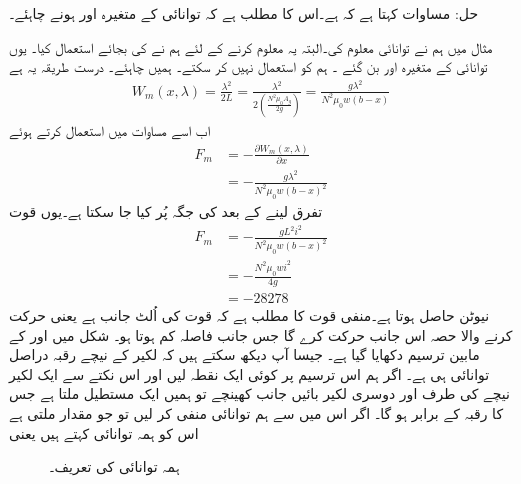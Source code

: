 حل:
	 مساوات   کہتا ہے کہ  ہے۔اس کا مطلب ہے کہ توانائی کے متغیرہ  اور  ہونے چاہئے۔

مثال  میں ہم نے توانائی معلوم کی۔البتہ یہ معلوم کرنے  کے لئے ہم نے  کی  بجائے  استعمال کیا۔ یوں  توانائی کے متغیرہ   اور  بن گئے ۔  ہم  کو استعمال نہیں کر سکتے۔ ہمیں  چاہئے۔ درست طریقہ یہ ہے
\begin{align*}
W_m(x,\lambda)=\frac{\lambda^2}{2 L}=\frac{\lambda^2}{2 \left(\frac{N^2 \mu_0 A_g}{2 g} \right)}=\frac{ g \lambda^2}{N^2 \mu_0 w (b-x)}
\end{align*}
اب اسے مساوات  میں استعمال کرتے ہوئے
\begin{align*}
F_m&=-\frac{\partial W_m(x,\lambda)}{\partial x}\\
&=-\frac{g \lambda^2}{N^2 \mu_0 w (b-x)^2}
\end{align*}
تفرق لینے کے بعد  کی جگہ  پُر کیا جا سکتا ہے۔یوں قوت
\begin{align*}
F_m&=-\frac{g L^2 i^2}{N^2 \mu_0 w (b-x)^2}\\
&=-\frac{N^2 \mu_0 w i^2}{4 g}\\
&=\num{-28278}
\end{align*}
نیوٹن حاصل ہوتا ہے۔منفی قوت کا مطلب ہے کہ قوت  کی اُلٹ جانب ہے یعنی حرکت کرنے والا حصہ اس جانب حرکت کرے گا جس جانب فاصلہ کم ہوتا ہو۔
%
	شکل   میں  اور  کے مابین ترسیم دکھایا گیا ہے۔ جیسا آپ دیکھ سکتے ہیں کہ لکیر کے نیچے رقبہ دراصل توانائی ہی ہے۔ اگر ہم اس ترسیم پر کوئی ایک نقطہ  لیں اور اس نکتے سے ایک لکیر نیچے کی طرف اور دوسری لکیر بائیں جانب کھینچے تو ہمیں ایک مستطیل ملتا ہے جس کا رقبہ  کے برابر ہو گا۔ اگر اس میں سے ہم توانائی   منفی کر لیں تو جو مقدار ملتی ہے اس کو ہمہ توانائی  کہتے ہیں یعنی
\begin{figure}
\centering
%
\caption{ہمہ توانائی کی تعریف۔}
\label{شکل_تبادلہ_توانائی_کو_توانائی_کی_تعریف}
\end{figure}

